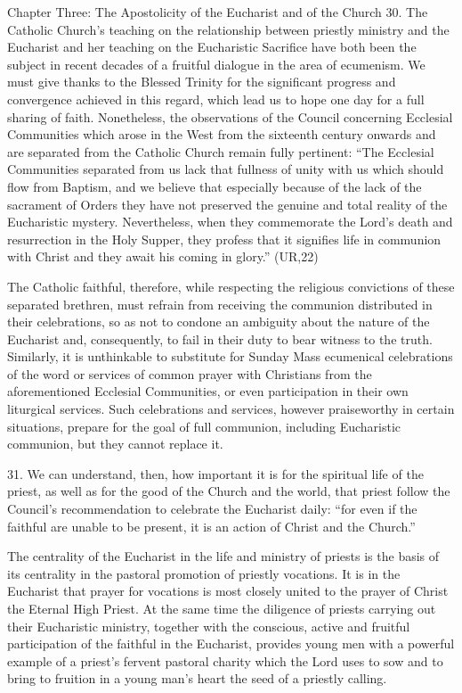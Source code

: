 \documentclass[oneside]{book}
\begin{document}
Chapter Three: The Apostolicity of the Eucharist and of the Church
30. The Catholic Church's teaching on the relationship between priestly ministry
and the Eucharist and her teaching on the Eucharistic Sacrifice have both been
the subject in recent decades of a fruitful dialogue in the area of
ecumenism. We must give thanks to the Blessed Trinity for the significant
progress and convergence achieved in this regard, which lead us to hope one day
for a full sharing of faith. Nonetheless, the observations of the Council
concerning Ecclesial Communities which arose in the West from the sixteenth
century onwards and are separated from the Catholic Church remain fully
pertinent: ``The Ecclesial Communities separated from us lack that fullness of
unity with us which should flow from Baptism, and we believe that especially
because of the lack of the sacrament of Orders they have not preserved the
genuine and total reality of the Eucharistic mystery. Nevertheless, when they
commemorate the Lord's death and resurrection in the Holy Supper, they profess
that it signifies life in communion with Christ and they await his coming in
glory.'' (UR,22)

The Catholic faithful, therefore, while respecting the religious convictions of
these separated brethren, must refrain from receiving the communion distributed
in their celebrations, so as not to condone an ambiguity about the nature of the
Eucharist and, consequently, to fail in their duty to bear witness to the
truth. Similarly, it is unthinkable to substitute for Sunday Mass ecumenical
celebrations of the word or services of common prayer with Christians from the
aforementioned Ecclesial Communities, or even participation in their own
liturgical services. Such celebrations and services, however praiseworthy in
certain situations, prepare for the goal of full communion, including
Eucharistic communion, but they cannot replace it.

31. We can understand, then, how important it is for the spiritual life of the
priest, as well as for the good of the Church and the world, that priest follow
the Council's recommendation to celebrate the Eucharist daily: ``for even if the
faithful are unable to be present, it is an action of Christ and the Church.''

The centrality of the Eucharist in the life and ministry of priests is the basis
of its centrality in the pastoral promotion of priestly vocations. It is in the
Eucharist that prayer for vocations is most closely united to the prayer of
Christ the Eternal High Priest. At the same time the diligence of priests
carrying out their Eucharistic ministry, together with the conscious, active and
fruitful participation of the faithful in the Eucharist, provides young men with
a powerful example of a priest's fervent pastoral charity which the Lord uses to
sow and to bring to fruition in a young man's heart the seed of a priestly
calling.
\end{document}
